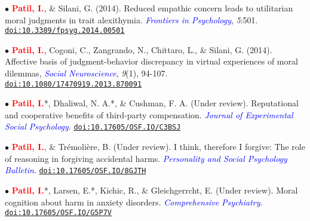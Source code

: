 \documentclass[10pt]{article}
\begin{document}
	$\bullet$ \textbf{\textcolor{red}{Patil, I.}}, \& Silani, G. (2014). Reduced empathic concern leads to utilitarian moral judgments in trait \hspace*{0.1in}alexithymia. \textit{\textcolor{blue}{Frontiers in Psychology}}, \textit{5}:501. \href{https://drive.google.com/file/d/0B6_u70YpdJKnUkJZR252dXBwcVk/view?usp=sharing}{\tt doi:10.3389/fpsyg.2014.00501}
	\miniskip
	
	$\bullet$ \textbf{\textcolor{red}{Patil, I.}}, Cogoni, C., Zangrando, N., Chittaro, L., \& Silani, G. (2014). {Affective basis of judgment-behavior \hspace*{0.1in}discrepancy in virtual experiences of moral dilemmas}, \textit{\textcolor{blue}{Social Neuroscience}}, \textit{9}(1), 94-107. \\
	\hspace*{0.1in}\href{https://drive.google.com/file/d/0B6_u70YpdJKnV3RIR2s2cWlFdVU/view?usp=sharing}{\tt doi:10.1080/17470919.2013.870091}
	\miniskip


	$\bullet$ \textbf{\textcolor{red}{Patil, I.}}*, Dhaliwal, N. A.*, \& Cushman, F. A. (Under review). Reputational and cooperative benefits of \hspace*{0.1in}third-party compensation. \textit{\textcolor{blue}{Journal of Experimental Social Psychology}}. \href{https://psyarxiv.com/c3bsj/}{\tt doi:10.17605/OSF.IO/C3BSJ}
	\miniskip
	
	$\bullet$ \textbf{\textcolor{red}{Patil, I.}}, \& Tr\'{e}moli\`{e}re, B. (Under review). I think, therefore I forgive: The role of reasoning in forgiving \hspace*{0.1in}accidental harms. \textit{\textcolor{blue}{Personality and Social Psychology Bulletin}}. \href{https://psyarxiv.com/8gjth/}{\tt doi:10.17605/OSF.IO/8GJTH}
	\miniskip
	
	$\bullet$ \textbf{\textcolor{red}{Patil, I.}}*, Larsen, E.*, Kichic, R., \& Gleichgerrcht, E. (Under review). Moral cognition about harm in \hspace*{0.1in}anxiety disorders. \textit{\textcolor{blue}{Comprehensive Psychiatry}}. \href{https://psyarxiv.com/g5p7v/}{\tt doi:10.17605/OSF.IO/G5P7V}
	\miniskip

		
\end{document}
